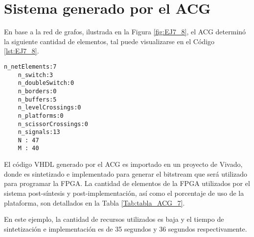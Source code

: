 \section{Sistema generado por el ACG}

	En base a la red de grafos, ilustrada en la Figura \ref{fig:EJ7_8}, el ACG determinó la siguiente cantidad de elementos, tal puede visualizarse en el Código \ref{lst:EJ7_8}.
	
	\begin{lstlisting}[language = {}, caption = Cantidad de elementos a implementar por el ACG, label = {lst:EJ7_8}]
	n_netElements:7
	n_switch:3
	n_doubleSwitch:0
	n_borders:0
	n_buffers:5
	n_levelCrossings:0
	n_platforms:0
	n_scissorCrossings:0
	n_signals:13
	N : 47
	M : 40
	\end{lstlisting}
	
	El código VHDL generado por el ACG es importado en un proyecto de Vivado, donde es sintetizado e implementado para generar el bitstream que será utilizado para programar la FPGA. La cantidad de elementos de la FPGA utilizados por el sistema post-síntesis y post-implementación, así como el porcentaje de uso de la plataforma, son detallados en la Tabla \ref{Tab:tabla_ACG_7}.
	
	\begin{table}[H]
		{
			\caption{Síntesis e implementación del ejemplo 7 generado por el ACG.}
			\label{Tab:tabla_ACG_7}
			\centering
			\begin{center}
			\end{center}
		}    
	\end{table}
	
	En este ejemplo, la cantidad de recursos utilizados es baja y el tiempo de sintetización e implementación es de 35 segundos y 36 segundos respectivamente.
